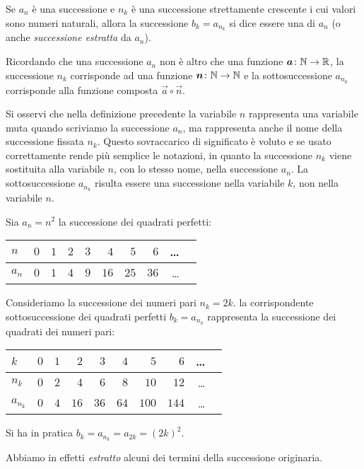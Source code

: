 \begin{definition}[sottosuccessione]
\mymark{*}
Se $a_n$ è una successione e $n_k$ è una successione strettamente crescente i cui valori sono numeri naturali, allora la successione
$b_k = a_{n_k}$ si dice essere una  di $a_n$
(o anche \emph{successione estratta} da $a_n$).
\end{definition}

Ricordando che una successione $a_n$ non è altro che una funzione
$\boldsymbol a\colon \mathbb N \to \mathbb R$, la successione $n_k$ corrisponde ad una funzione
$\boldsymbol n\colon \mathbb N \to \mathbb N$ e la sottosuccessione $a_{n_k}$ corrisponde alla
funzione composta $\vec a \circ \vec n$.

Si osservi che nella definizione precedente la variabile $n$ rappresenta
una variabile muta quando scriviamo la successione $a_n$, ma
rappresenta anche il nome della successione fissata $n_k$.
Questo sovraccarico
di significato è voluto e se usato correttamente rende più semplice
le notazioni, in quanto la successione $n_k$ viene sostituita alla
variabile $n$, con lo stesso nome, nella successione $a_n$.
La sottosuccessione $a_{n_k}$ risulta essere una successione nella variabile $k$, non nella variabile $n$.

\begin{example}
Sia $a_n = n^2$ la successione dei quadrati perfetti:
\begin{center}
\begin{tabular}{l|rrrrrrrrr}
$n$   & $0$ & $1$ & $2$ & $3$ & $4$  & $5$  & $6$  & \dots \\ \hline
$a_n$ & $0$ & $1$ & $4$ & $9$ & $16$ & $25$ & $36$ & \dots
\end{tabular}
\end{center}
Consideriamo la successione dei numeri pari $n_k = 2k$.
la corrispondente sottosuccessione dei quadrati perfetti
$b_k = a_{n_k}$
rappresenta la successione dei quadrati dei numeri pari:
\begin{center}
\begin{tabular}{l|rrrrrrrrr}
$k$       & $0$ & $1$ & $2$ & $3$ & $4$  & $5$  & $6$  & \dots \\ \hline
$n_k$ & $0$ & $2$ & $4$ & $6$ & $8$ & $10$ & $12$ & \dots \\
$a_{n_k}$ & $0$ & $4$ & $16$ & $36$ & $64$ & $100$ & $144$ & \dots
\end{tabular}
\end{center}
Si ha in pratica
  $b_k = a_{n_k} = a_{2k} = (2k)^2$.

Abbiamo in effetti \emph{estratto} alcuni dei termini della successione
originaria.
\end{example}


